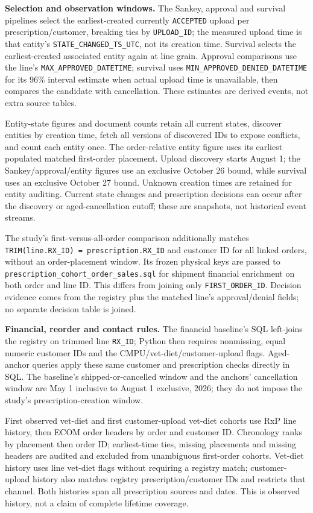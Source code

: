 \clearpage
\noindent\textbf{Selection and observation windows.}
The Sankey, approval and survival pipelines select the earliest-created currently
\texttt{ACCEPTED} upload per prescription/customer, breaking ties by
\texttt{UPLOAD\_ID}; the measured upload time is that entity's
\texttt{STATE\_CHANGED\_TS\_UTC}, not its creation time. Survival selects the
earliest-created associated entity again at line grain. Approval comparisons use
the line's \texttt{MAX\_APPROVED\_DATETIME}; survival uses
\texttt{MIN\_APPROVED\_DENIED\_DATETIME} for its 96\% interval estimate when actual
upload time is unavailable, then compares the candidate with cancellation.
These estimates are derived events, not extra source tables.

Entity-state figures and document counts retain all current states, discover
entities by creation time, fetch all versions of discovered IDs to expose
conflicts, and count each entity once. The order-relative entity figure uses
its earliest populated matched first-order placement. Upload discovery starts
August 1; the Sankey/approval/entity figures use an exclusive October 26 bound,
while survival uses an exclusive October 27 bound. Unknown creation times are
retained for entity auditing. Current state changes and prescription decisions
can occur after the discovery or aged-cancellation cutoff; these are snapshots,
not historical event streams.

The study's first-versus-all-order comparison additionally matches
\texttt{TRIM(line.RX\_ID) = prescription.RX\_ID} and customer ID for all linked
orders, without an order-placement window. Its frozen physical keys are passed
to \texttt{prescription\_cohort\_order\_sales.sql} for shipment financial enrichment
on both order and line ID. This differs from joining only
\texttt{FIRST\_ORDER\_ID}. Decision evidence comes from the registry plus the
matched line's approval/denial fields; no separate decision table is joined.

\noindent\textbf{Financial, reorder and contact rules.}
The financial baseline's SQL left-joins the registry on trimmed line
\texttt{RX\_ID}; Python then requires nonmissing, equal numeric customer IDs and
the CMPU/vet-diet/customer-upload flags. Aged-anchor queries apply these same
customer and prescription checks directly in SQL. The baseline's shipped-or-cancelled
window and the anchors' cancellation window are May 1 inclusive to August 1
exclusive, 2026; they do not impose the study's prescription-creation window.

First observed vet-diet and first customer-upload vet-diet cohorts use RxP line
history, then ECOM order headers by order and customer ID. Chronology ranks by
placement then order ID; earliest-time ties, missing placements and missing
headers are audited and excluded from unambiguous first-order cohorts. Vet-diet
history uses line vet-diet flags without requiring a registry match;
customer-upload history also matches registry prescription/customer IDs and
restricts that channel. Both histories span all prescription sources and dates. This is observed
history, not a claim of complete lifetime coverage.

